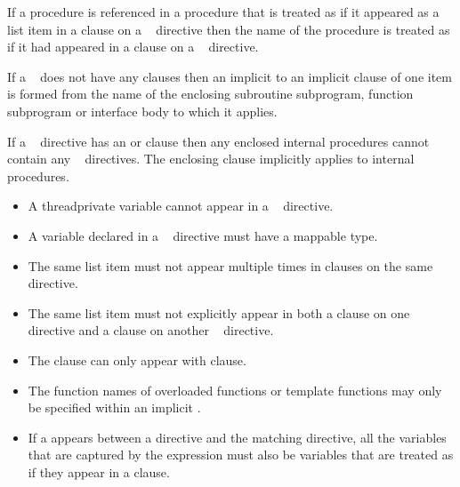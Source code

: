 \begin{fortranspecific}
If a procedure is referenced in a procedure that is treated as if it appeared
as a list item in a  clause on a ~
directive then the name of the procedure is treated as if it had appeared in a
 clause on a ~ directive.

If a ~ does not have any clauses then an implicit
 to an implicit  clause of one item is formed from
the name of the enclosing subroutine subprogram, function subprogram or
interface body to which it applies.

If a ~ directive has an  or  clause
then any enclosed internal procedures cannot contain any ~ directives.
The enclosing  clause implicitly applies to internal procedures.
\end{fortranspecific}


\restrictions
\begin{itemize}
\item A threadprivate variable cannot appear in a
      ~ directive.

\item A variable declared in a ~ directive
      must have a mappable type.

\item The same list item must not appear multiple times in clauses on the same directive.

\item The same list item must not explicitly appear in both a  clause on one
~ directive and a  clause on
another ~ directive.

\item The  clause can only appear with  clause.

\end{itemize}

\begin{cppspecific}
\begin{itemize}
\item The function names of overloaded functions or template functions
may only be specified within an implicit .

\item If a  appears between a
 directive and the matching  directive, all the variables that are captured by the
 expression must also be variables that are treated as
if they appear in a  clause.
\end{itemize}
\end{cppspecific}

